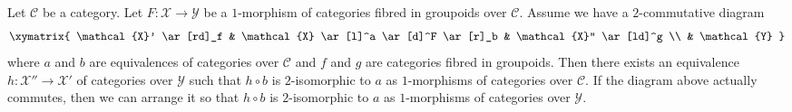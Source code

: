 \begin{lemma}
\label{lemma-amelioration-unique}
Let $\mathcal{C}$ be a category. Let $F : \mathcal{X} \to \mathcal{Y}$
be a $1$-morphism of categories fibred in groupoids over $\mathcal{C}$.
Assume we have a $2$-commutative diagram
$$
\xymatrix{
\mathcal{X}' \ar[rd]_f &
\mathcal{X} \ar[l]^a \ar[d]^F \ar[r]_b &
\mathcal{X}'' \ar[ld]^g \\
& \mathcal{Y}
}
$$
where $a$ and $b$ are equivalences of categories over $\mathcal{C}$
and $f$ and $g$ are categories fibred in groupoids. Then there exists
an equivalence $h : \mathcal{X}'' \to \mathcal{X}'$ of categories over
$\mathcal{Y}$ such that $h \circ b$ is $2$-isomorphic to $a$ as $1$-morphisms
of categories over $\mathcal{C}$. If the diagram above actually commutes, then
we can arrange it so that $h \circ b$ is $2$-isomorphic to $a$ as
$1$-morphisms of categories over $\mathcal{Y}$.
\end{lemma}

